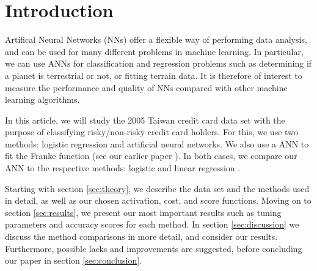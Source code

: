 \section{Introduction}
\label{sec:introduction}

Artifical Neural Networks (NNs) offer a flexible way of performing data analysis, and can be used
for many different problems in machine learning. In particular, we can use ANNs for
classification and regression problems such as determining if a planet is terrestrial
or not, or fitting terrain data. It is therefore of interest to measure the performance
and quality of NNs compared with other machine learning algorithms.

In this article, we will study the 2005 Taiwan credit card data set with the purpose
of classifying risky/non-risky credit card holders. For this, we use two methods:
logistic regression and artificial neural networks. We also use a ANN to fit
the Franke function (see our earlier paper \citet{prosjekt1}). In both cases, we compare
our ANN to the respective methods: logistic and linear regression \citep{prosjekt1}.

Starting with section \ref{sec:theory}, we describe the data set and
the methods used in detail, as well as our chosen activation, cost, and score functions.
Moving on to section \ref{sec:results}, we present our most important results such as
tuning parameters and accuracy scores for each method. In section \ref{sec:discussion}
we discuss the method comparisons in more detail, and consider our results. Furthermore,
possible lacks and improvements are suggested, before concluding our paper in section
\ref{sec:conclusion}.
